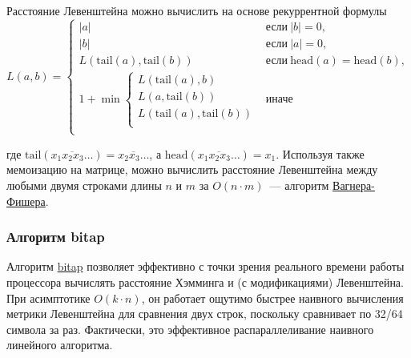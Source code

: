 Расстояние Левенштейна можно вычислить на основе рекуррентной формулы \[L(a,b) = \begin{cases}
    |a|                                  & \text{если}~|b| = 0,                         \\
    |b|                                  & \text{если}~|a| = 0,                         \\
    L(\text{tail}(a), \text{tail}(b))    & \text{если}~\text{head}(a) = \text{head}(b), \\
    1 + \min \begin{cases}
               L(\text{tail}(a), b)              \\
               L(a, \text{tail}(b))              \\
               L(\text{tail}(a), \text{tail}(b)) \\
             \end{cases} & \text{иначе}                                          \\
  \end{cases}
\]

где \(\text{tail}(\overline{x_1x_2x_3\dots}) = \overline{x_2x_3\dots}\), а \(\text{head}(\overline{x_1x_2x_3\dots}) = x_1\).
Используя также мемоизацию на матрице, можно вычислить расстояние Левенштейна между любыми двумя строками длины \(n\) и \(m\) за
\(O(n\cdot m)\)~--- алгоритм \href{https://neerc.ifmo.ru/wiki/index.php?title=%D0%97%D0%B0%D0%B4%D0%B0%D1%87%D0%B0_%D0%BE_%D1%80%D0%B5%D0%B4%D0%B0%D0%BA%D1%86%D0%B8%D0%BE%D0%BD%D0%BD%D0%BE%D0%BC_%D1%80%D0%B0%D1%81%D1%81%D1%82%D0%BE%D1%8F%D0%BD%D0%B8%D0%B8,_%D0%B0%D0%BB%D0%B3%D0%BE%D1%80%D0%B8%D1%82%D0%BC_%D0%92%D0%B0%D0%B3%D0%BD%D0%B5%D1%80%D0%B0-%D0%A4%D0%B8%D1%88%D0%B5%D1%80%D0%B0}{Вагнера-Фишера}.

\subsubsection{Алгоритм bitap}
Алгоритм \href{https://en.wikipedia.org/wiki/Bitap_algorithm}{bitap} позволяет эффективно с точки зрения реального времени работы процессора вычислять расстояние Хэмминга и
(с модификациями) Левенштейна. При асимптотике \(O(k\cdot n)\), он работает ощутимо быстрее наивного вычисления метрики
Левенштейна для сравнения двух строк, поскольку сравнивает по 32/64 символа за раз. Фактически, это эффективное
распараллеливание наивного линейного алгоритма.

